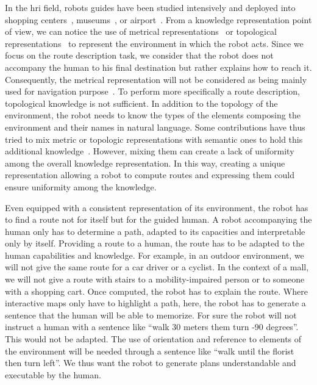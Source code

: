 In the \acrfull{hri} field, robots guides have been studied intensively and deployed into shopping centers~\cite{okuno_2009_providing}, museums~\cite{burgard_1999_museum, clodic_2006_rackham, siegwart_2003_robox}, or airport~\cite{triebel_2016_spencer}. From a knowledge representation point of view, we can notice the use of metrical representations~\cite{thrun_2007_simultaneous} or topological representations~\cite{morales_2011_modeling} to represent the environment in which the robot acts. Since we focus on the route description task, we consider that the robot does not accompany the human to his final destination but rather explains how to reach it. Consequently, the metrical representation will not be considered as being mainly used for navigation purpose~\cite{thrun_2007_simultaneous}. To perform more specifically a route description, topological knowledge is not sufficient. In addition to the topology of the environment, the robot needs to know the types of the elements composing the environment and their names in natural language. Some contributions have thus tried to mix metric or topologic representations with semantic ones to hold this additional knowledge~\cite {satake_2015_should, chrastil_2014_cognitive, zender_2008_conceptual}. However, mixing them can create a lack of uniformity among the overall knowledge representation. In this way, creating a unique representation allowing a robot to compute routes and expressing them could ensure uniformity among the knowledge.

Even equipped with a consistent representation of its environment, the robot has to find a route not for itself but for the guided human. A robot accompanying the human only has to determine a path, adapted to its capacities and interpretable only by itself. Providing a route to a human, the route has to be adapted to the human capabilities and knowledge. For example, in an outdoor environment, we will not give the same route for a car driver or a cyclist. In the context of a mall, we will not give a route with stairs to a mobility-impaired person or to someone with a shopping cart. Once computed, the robot has to explain the route. Where interactive maps only have to highlight a path, here, the robot has to generate a sentence that the human will be able to memorize. For sure the robot will not instruct a human with a sentence like ``walk 30 meters them turn -90 degrees''. This would not be adapted. The use of orientation and reference to elements of the environment will be needed through a sentence like ``walk until the florist then turn left''. We thus want the robot to generate plans understandable and executable by the human.


